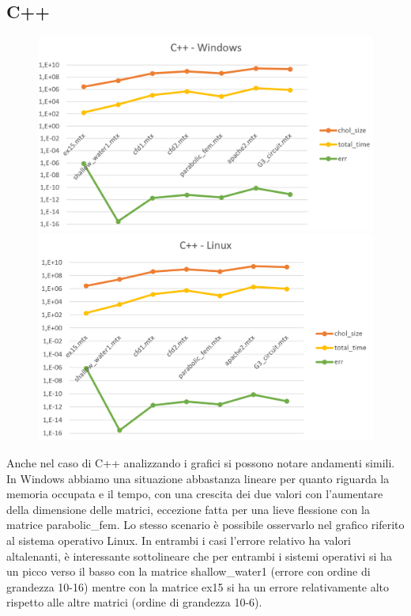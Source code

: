 \documentclass[a4paper,10pt]{article}
\begin{document}
\subsection{C++}

\begin{figure}[H]
\centering
\begin{minipage}{.6\textwidth}
  \centering
  \includegraphics[width=1\linewidth]{img/c++win.png}
\end{minipage}%
\begin{minipage}{.6\textwidth}
  \centering
  \includegraphics[width=1\linewidth]{img/c++linux.png}
\end{minipage}
\end{figure}

Anche nel caso di C++ analizzando i grafici si possono notare andamenti simili.
In Windows abbiamo una situazione abbastanza lineare per quanto riguarda la memoria occupata e il tempo, con una crescita dei due valori con l’aumentare della dimensione delle matrici, eccezione fatta per una lieve flessione con la matrice parabolic\_fem. 
Lo stesso scenario è possibile osservarlo nel grafico riferito al sistema operativo Linux.
In entrambi i casi l’errore relativo ha valori altalenanti, è interessante sottolineare che per entrambi i sistemi operativi si ha un picco verso il basso con la matrice shallow\_water1 (errore con ordine di grandezza 10-16) mentre con la matrice ex15 si ha un errore relativamente alto rispetto alle altre matrici (ordine di grandezza 10-6).
\end{document}
